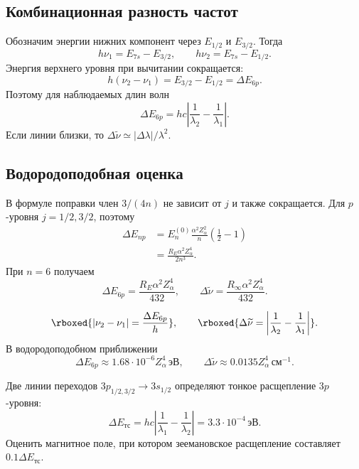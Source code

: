 \documentclass[../final.tex]{subfiles}
\begin{document}
\subsection*{Комбинационная разность частот}
Обозначим энергии нижних компонент через $E_{1/2}$ и $E_{3/2}$.
Тогда
\[
    h\nu_1=E_{7s}-E_{3/2},\qquad
    h\nu_2=E_{7s}-E_{1/2}.
\]
Энергия верхнего уровня при вычитании сокращается:
\[
    h(\nu_2-\nu_1)=E_{3/2}-E_{1/2}=\Delta E_{6p}.
\]
Поэтому для наблюдаемых длин волн
\[
    \Delta E_{6p}=hc\left|\frac1{\lambda_2}-\frac1{\lambda_1}\right|.
\]
Если линии близки, то $\Delta\widetilde\nu\simeq|\Delta\lambda|/\lambda^2$.

\subsection*{Водородоподобная оценка}
В формуле поправки член $3/(4n)$ не зависит от $j$ и также сокращается.
Для $p$-уровня $j=1/2,3/2$, поэтому
\begin{align*}
    \Delta E_{np}
    &=E_n^{(0)}\frac{\alpha^2Z_{\alpha}^2}{n}
       \left(\frac12-1\right)\\
    &=\frac{R_E\alpha^2Z_{\alpha}^4}{2n^3}.
\end{align*}
При $n=6$ получаем
\[
    \Delta E_{6p}=\frac{R_E\alpha^2Z_{\alpha}^4}{432},\qquad
    \Delta\widetilde\nu
       =\frac{R_\infty\alpha^2Z_{\alpha}^4}{432}.
\]

\answer
\[
    \rboxed{|\nu_2-\nu_1|=\frac{\Delta E_{6p}}h},\qquad
    \rboxed{\Delta\widetilde\nu
       =\left|\frac1{\lambda_2}-\frac1{\lambda_1}\right|}.
\]
В водородоподобном приближении
\[
    \Delta E_{6p}\approx1.68\cdot10^{-6}Z_{\alpha}^4\,\text{эВ},\qquad
    \Delta\widetilde\nu\approx0.0135Z_{\alpha}^4\,\text{см}^{-1}.
\]


\condition
Две линии переходов $3p_{1/2,3/2}\to3s_{1/2}$ определяют тонкое
расщепление $3p$-уровня:
\[
    \Delta E_{\text{тс}}
      =hc\left|\frac1{\lambda_1}-\frac1{\lambda_2}\right|
      =3.3\cdot10^{-4}\,\text{эВ}.
\]
Оценить магнитное поле, при котором зеемановское расщепление
составляет $0.1\Delta E_{\text{тс}}$.
\end{document}
